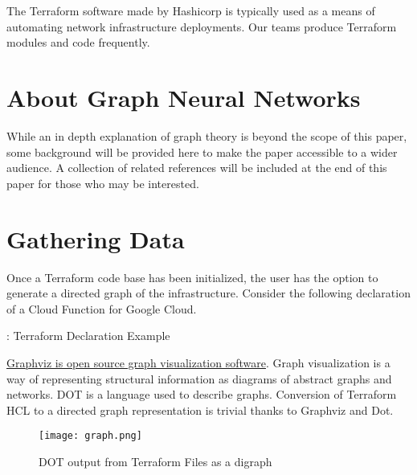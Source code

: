 



\vspace{2mm}

\vspace{2mm}
\section{\label{sec:Introduction}\mytitle}

\justifying
The Terraform software made by Hashicorp is typically used as a means of automating network infrastructure
deployments. Our teams produce Terraform modules and code frequently.

\section{\label{sec:Graph}About Graph Neural Networks}

\justifying
While an in depth explanation of graph theory is beyond the scope of this paper, some background
will be provided here to make the paper accessible to a wider audience. A collection of related references
will be included at the end of this paper for those who may be interested.

\section{\label{sec:collection}Gathering Data}

\justifying
Once a Terraform code base has been initialized, the user has the option to generate a directed graph of the infrastructure. Consider the following declaration of a Cloud Function for Google Cloud.

\begin{mybox}{\thetcbcounter: Terraform Declaration Example}
    
\end{mybox}


\justifying
\href{https://graphviz.org/}{Graphviz is open source graph visualization software}. Graph visualization is a way of representing
structural information as diagrams of abstract graphs and networks. DOT is a language used to describe graphs. Conversion of
Terraform HCL to a directed graph representation is trivial thanks to Graphviz and Dot.

\justifying
\begin{figure}[H]
	\texttt{[image: graph.png]}
	\caption{DOT output from Terraform Files as a digraph}
	\label{pygraph}
\end{figure}

